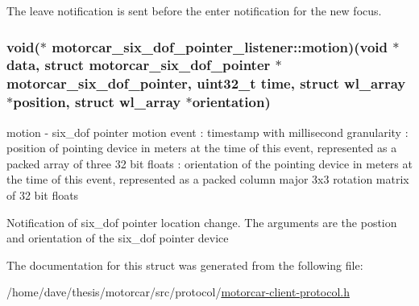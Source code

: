 The leave notification is sent before the enter notification for the new focus. \hypertarget{structmotorcar__six__dof__pointer__listener_ae2701450acd4d0c55f5b0ffa54fad191}{
\subsubsection[{motion}]{\setlength{\rightskip}{0pt plus 5cm}void($\ast$ motorcar\-\_\-six\-\_\-dof\-\_\-pointer\-\_\-listener\-::motion)(void $\ast$data, struct motorcar\-\_\-six\-\_\-dof\-\_\-pointer $\ast$motorcar\-\_\-six\-\_\-dof\-\_\-pointer, uint32\-\_\-t time, struct wl\-\_\-array $\ast$position, struct wl\-\_\-array $\ast$orientation)}}\label{structmotorcar__six__dof__pointer__listener_ae2701450acd4d0c55f5b0ffa54fad191}
motion -\/ six\-\_\-dof pointer motion event \-: timestamp with millisecond granularity \-: position of pointing device in meters at the time of this event, represented as a packed array of three 32 bit floats \-: orientation of the pointing device in meters at the time of this event, represented as a packed column major 3x3 rotation matrix of 32 bit floats

Notification of six\-\_\-dof pointer location change. The arguments are the postion and orientation of the six\-\_\-dof pointer device 

The documentation for this struct was generated from the following file\-:\begin{DoxyCompactItemize}
\item 
/home/dave/thesis/motorcar/src/protocol/\hyperlink{motorcar-client-protocol_8h}{motorcar-\/client-\/protocol.\-h}\end{DoxyCompactItemize}
